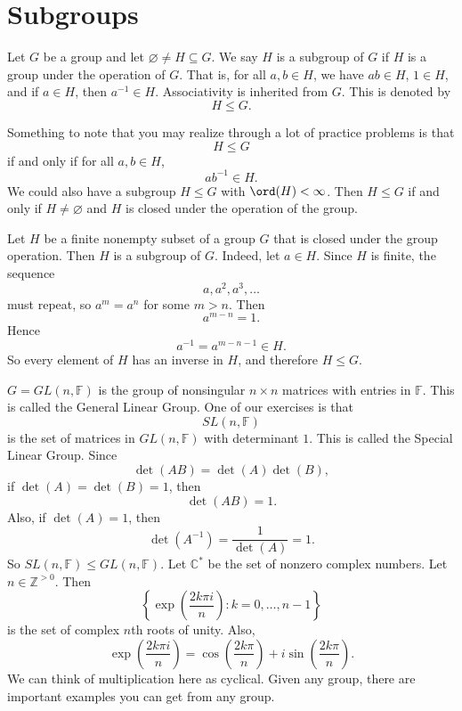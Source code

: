 
\section{Subgroups}

\begin{definition}[Subgroup]
    Let $G$ be a group and let $\varnothing\neq H\subseteq G$.
    We say $H$ is a subgroup of $G$ if $H$ is a group under the operation of $G$.
    That is, for all $a,b\in H$, we have $ab\in H$, $1\in H$, and if $a\in H$, then $a^{-1}\in H$.
    Associativity is inherited from $G$.
    This is denoted by
    \[
        H\leq G.
    \]
\end{definition}

Something to note that you may realize through a lot of practice problems is that
\[
    H\leq G
\]
if and only if for all $a,b\in H$,
\[
    ab^{-1}\in H.
\]
We could also have a subgroup $H\leq G$ with $\ord(H)<\infty$.
Then $H\leq G$ if and only if $H\neq\varnothing$ and $H$ is closed under the operation of the group.

\begin{example}
    Let $H$ be a finite nonempty subset of a group $G$ that is closed under the group operation.
    Then $H$ is a subgroup of $G$.
    Indeed, let $a\in H$.
    Since $H$ is finite, the sequence
    \[
        a,a^2,a^3,\dots
    \]
    must repeat, so $a^m=a^n$ for some $m>n$.
    Then
    \[
        a^{m-n}=1.
    \]
    Hence
    \[
        a^{-1}=a^{m-n-1}\in H.
    \]
    So every element of $H$ has an inverse in $H$, and therefore $H\leq G$.
\end{example}

$G=GL(n,\mathbb{F})$ is the group of nonsingular $n\times n$ matrices with entries in $\mathbb{F}$.
This is called the General Linear Group.
One of our exercises is that
\[
    SL(n,\mathbb{F})
\]
is the set of matrices in $GL(n,\mathbb{F})$ with determinant $1$.
This is called the Special Linear Group.
Since
\[
    \det(AB)=\det(A)\det(B),
\]
if $\det(A)=\det(B)=1$, then
\[
    \det(AB)=1.
\]
Also, if $\det(A)=1$, then
\[
    \det(A^{-1})=\frac{1}{\det(A)}=1.
\]
So $SL(n,\mathbb{F})\leq GL(n,\mathbb{F})$.
Let $\mathbb{C}^*$ be the set of nonzero complex numbers.
Let $n\in\mathbb{Z}^{>0}$.
Then
\[
    \left\{
        \exp\left(\frac{2k\pi i}{n}\right):k=0,\dots,n-1
    \right\}
\]
is the set of complex $n$th roots of unity.
Also,
\[
    \exp\left(\frac{2k\pi i}{n}\right)
    =
    \cos\left(\frac{2k\pi}{n}\right)
    +
    i\sin\left(\frac{2k\pi}{n}\right).
\]
We can think of multiplication here as cyclical.
Given any group, there are important examples you can get from any group.

